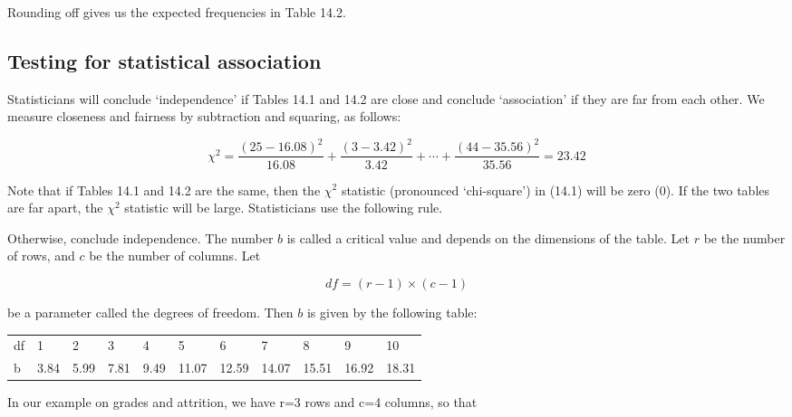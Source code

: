 \documentclass[11pt]{book}\usepackage[]{graphicx}\usepackage[]{color}
\begin{document}
Rounding off gives us the expected frequencies in Table 14.2.

\subsection{Testing for statistical association}

Statisticians will conclude `independence' if Tables 14.1 and 14.2 are close and conclude `association' if they are far from each other.    We measure closeness and fairness by subtraction and squaring, as follows:



\begin{equation*}
\chi^2 = \frac{(25-16.08)^2}{16.08} + \frac{(3-3.42)^2}{3.42} + \cdots + \frac{(44-35.56)^2}{35.56} = 23.42  
\end{equation*}

Note that if Tables 14.1 and 14.2 are the same, then the $\chi^2$ statistic (pronounced `chi-square') in (14.1) will be zero (0).  If the two tables are far apart, the $\chi^2$ statistic will be large.  Statisticians use the following rule. 

\begin{center}
\end{center}

Otherwise, conclude independence.  The number $b$ is called a critical value and depends on the dimensions of the table.  Let $r$ be the number of rows, and $c$ be the number of columns.  Let

\begin{equation*}
df = (r - 1) \times (c - 1)
\end{equation*}

\vspace{1cm}
be a parameter called the degrees of freedom.  Then $b$ is given by the following table:

\begin{table}[ht]
\centering
\begin{tabular}{@{} lllllllllll @{}} \hline
df & 1&2&3&4&5&6&7&8&9&10 \\
b  & 3.84&5.99&7.81&9.49&11.07&12.59&14.07&15.51&16.92&18.31 \\ \hline
\end{tabular}
\end{table}

In our example on grades and attrition, we have r=3 rows and c=4 columns, so that
\end{document}
